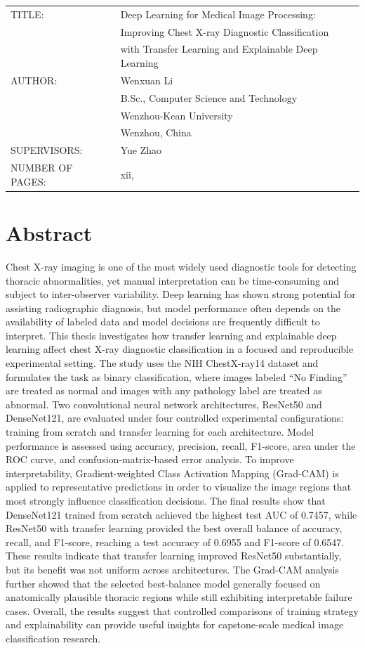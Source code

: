 \documentclass[12pt, oneside]{book}
\newcommand{\thesistitleI}{Deep Learning for Medical Image Processing:}
\newcommand{\thesistitleII}{Improving Chest X-ray Diagnostic Classification}
\newcommand{\thesistitleIII}{with Transfer Learning and Explainable Deep Learning}
\newcommand{\myname}{Wenxuan Li}
\begin{document}
\begin{tabular}{@{}l p{}@{}}
  TITLE:           &\thesistitleI\\
                   &\thesistitleII\\
                   &\thesistitleIII\\[5mm]
  AUTHOR:          &\myname\\
                   &B.Sc., Computer Science and Technology\\
                   &Wenzhou-Kean University\\
                   &Wenzhou, China\\[5mm]
  SUPERVISORS:     &Yue Zhao\\[5mm]
  NUMBER OF PAGES: &xii, \pageref*{endmainmatter}
\end{tabular}

\vfill

\clearpage
\chapter*{Abstract}
Chest X-ray imaging is one of the most widely used diagnostic tools for detecting thoracic abnormalities, yet manual interpretation can be time-consuming and subject to inter-observer variability. Deep learning has shown strong potential for assisting radiographic diagnosis, but model performance often depends on the availability of labeled data and model decisions are frequently difficult to interpret. This thesis investigates how transfer learning and explainable deep learning affect chest X-ray diagnostic classification in a focused and reproducible experimental setting. The study uses the NIH ChestX-ray14 dataset and formulates the task as binary classification, where images labeled ``No Finding'' are treated as normal and images with any pathology label are treated as abnormal. Two convolutional neural network architectures, ResNet50 and DenseNet121, are evaluated under four controlled experimental configurations: training from scratch and transfer learning for each architecture. Model performance is assessed using accuracy, precision, recall, F1-score, area under the ROC curve, and confusion-matrix-based error analysis. To improve interpretability, Gradient-weighted Class Activation Mapping (Grad-CAM) is applied to representative predictions in order to visualize the image regions that most strongly influence classification decisions. The final results show that DenseNet121 trained from scratch achieved the highest test AUC of 0.7457, while ResNet50 with transfer learning provided the best overall balance of accuracy, recall, and F1-score, reaching a test accuracy of 0.6955 and F1-score of 0.6547. These results indicate that transfer learning improved ResNet50 substantially, but its benefit was not uniform across architectures. The Grad-CAM analysis further showed that the selected best-balance model generally focused on anatomically plausible thoracic regions while still exhibiting interpretable failure cases. Overall, the results suggest that controlled comparisons of training strategy and explainability can provide useful insights for capstone-scale medical image classification research.
\end{document}
